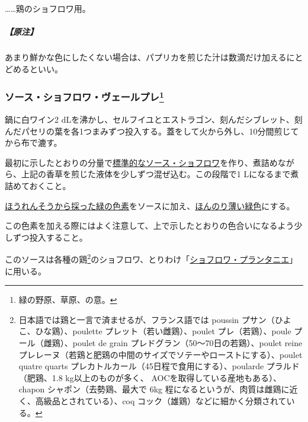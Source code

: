 \begin{recette}
\ldots{}\ldots{}鶏のショフロワ用。

\hypertarget{nota-sauce-chaud-froid-aurore}{%
\subparagraph{【原注】}\label{nota-sauce-chaud-froid-aurore}}

あまり鮮かな色にしたくない場合は、パプリカを煎じた汁は数滴だけ加えるにとどめるといい。

\hypertarget{sauce-choud-froid-vert-pre}{%
\subsubsection[ソース・ショフロワ・ヴェールプレ]{\texorpdfstring{ソース・ショフロワ・ヴェールプレ\footnote{緑の野原、草原、の意。}}{ソース・ショフロワ・ヴェールプレ}}\label{sauce-choud-froid-vert-pre}}



鍋に白ワイン2
dLを沸かし、セルフイユとエストラゴン、刻んだシブレット、刻んだパセリの葉を各1つまみずつ投入する。蓋をして火から外し、10分間煎じてから布で漉す。

最初に示したとおりの分量で\protect\hyperlink{sauce-chaud-froid-blanche-ordinaire}{標準的なソース・ショフロワ}を作り、煮詰めながら、上記の香草を煎じた液体を少しずつ混ぜ込む。この段階で1
Lになるまで煮詰めておくこと。

\protect\hyperlink{}{ほうれんそうから採った緑の色素}をソースに加え、\ul{ほんのり薄い緑色}にする。

この色素を加える際にはよく注意して、上で示したとおりの色合いになるよう少しずつ投入すること。

このソースは各種の鶏\footnote{日本語では鶏と一言で済ませるが、フランス語では
  poussin プサン（ひよこ、ひな鶏）、poulette
  プレット（若い雌鶏）、poulet プレ（若鶏）、poule
  プール（雌鶏）、poulet de grain プレドグラン（50〜70日の若鶏）、poulet
  reine
  プレレーヌ（若鶏と肥鶏の中間のサイズでソテーやローストにする）、poulet
  quatre quarts プレカトルカール（45日程で食用にする）、poularde
  プラルド（肥鶏、1.8 kg以上のものが多く、
  AOCを取得している産地もある）、chapon シャポン（去勢鶏、最大で 6kg
  程になるというが、肉質は雌鶏に近く、高級品とされている）、coq
  コック（雄鶏）などに細かく分類されている。}のショフロワ、とりわけ「\protect\hyperlink{}{ショフロワ・プランタニエ}」に用いる。


\end{recette}
